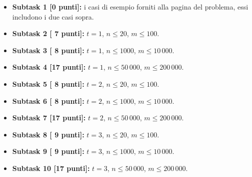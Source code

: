   \begin{itemize}
    \item \textbf{Subtask 1 [0 punti]:} i casi di esempio forniti alla pagina del problema, essi includono i due casi sopra.
    \item \textbf{Subtask 2 [ 7 punti]:} $t=1$, $n \le 20$, $m \le 100$.
    \item \textbf{Subtask 3 [ 8 punti]:} $t=1$, $n \le 1000$, $m \le 10\,000$.
    \item \textbf{Subtask 4 [17 punti]:} $t=1$, $n \le 50\,000$, $m \le 200\,000$.
    \item \textbf{Subtask 5 [ 8 punti]:} $t=2$, $n \le 20$, $m \le 100$.
    \item \textbf{Subtask 6 [ 8 punti]:} $t=2$, $n \le 1000$, $m \le 10\,000$.
    \item \textbf{Subtask 7 [17 punti]:} $t=2$, $n \le 50\,000$, $m \le 200\,000$.
    \item \textbf{Subtask 8 [ 9 punti]:} $t=3$, $n \le 20$, $m \le 100$.
    \item \textbf{Subtask 9 [ 9 punti]:} $t=3$, $n \le 1000$, $m \le 10\,000$.
    \item \textbf{Subtask 10 [17 punti]:} $t=3$, $n \le 50\,000$, $m \le 200\,000$.
  \end{itemize}
  
